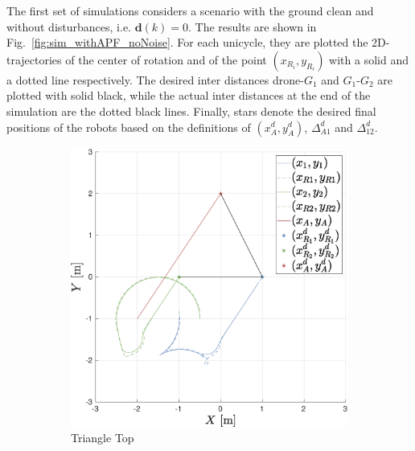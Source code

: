 \documentclass{ifacconf}
\begin{document}
The first set of simulations considers a scenario with the ground clean 
and without disturbances, i.e. $\boldsymbol{d}(k) = 0$.
The results are shown in Fig.~\ref{fig:sim_withAPF_noNoise}.
For each unicycle, they are plotted the 2D-trajectories 
of the center of rotation and of the point $(x_{R_i}, y_{R_i})$ 
with a solid and a dotted line respectively.
The desired inter distances drone-$G_1$ and $G_1$-$G_2$ are plotted 
with solid black, while the actual inter distances at the end of the simulation 
are the dotted black lines.
Finally, stars denote the desired final positions of the robots 
based on the definitions of $(x^d_A, y^d_A)$, $ \Delta^d_{A1}$ and $\Delta^d_{12}$.
\begin{figure}[b]
    \centering
    \begin{subfigure}[b]{0.32\columnwidth}
        \centering
        \includegraphics[width=\linewidth]{images/simulations/with_APF/not_noisy/1st_scenario_with_noNoise.eps}
         \caption{Triangle Top}
         \label{fig:sim_withAPF_noNoise_1}
    \end{subfigure}
    \begin{subfigure}[b]{0.32\columnwidth}
        \centering

\end{subfigure}
\end{figure}
\end{document}

